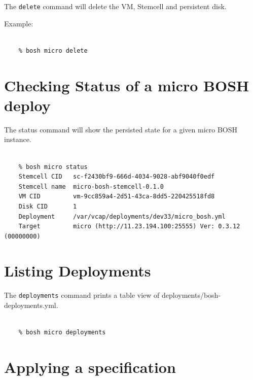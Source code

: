 The \texttt{delete} command will delete the VM, Stemcell and persistent disk.

Example:

\begin{adjustwidth}{2.5em}{2.5em}
\begin{verbatim}

    % bosh micro delete

\end{verbatim}
\end{adjustwidth}

\section{Checking Status of a micro BOSH deploy}
\label{checkingstatusofamicroboshdeploy}

The status command will show the persisted state for a given micro BOSH instance.

\begin{adjustwidth}{2.5em}{2.5em}
\begin{verbatim}

    % bosh micro status
    Stemcell CID   sc-f2430bf9-666d-4034-9028-abf9040f0edf
    Stemcell name  micro-bosh-stemcell-0.1.0
    VM CID         vm-9cc859a4-2d51-43ca-8dd5-220425518fd8
    Disk CID       1
    Deployment     /var/vcap/deployments/dev33/micro_bosh.yml
    Target         micro (http://11.23.194.100:25555) Ver: 0.3.12 (00000000)

\end{verbatim}
\end{adjustwidth}

\section{Listing Deployments}
\label{listingdeployments}

The \texttt{deployments} command prints a table view of deployments\slash bosh-deployments.yml.

\begin{adjustwidth}{2.5em}{2.5em}
\begin{verbatim}

    % bosh micro deployments

\end{verbatim}
\end{adjustwidth}

\section{Applying a specification}
\label{applyingaspecification}

